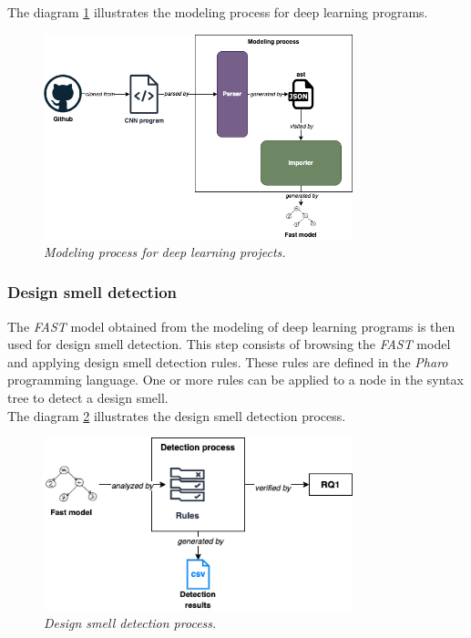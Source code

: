 The diagram \ref{fig:modelling} illustrates the modeling process for deep learning programs.\\

\begin{figure}[h!]
  \centering
  \includegraphics[width=0.8\textwidth]{figure/design_smell_modeling.png}
  \caption{\emph{Modeling process for deep learning projects.}}
  \label{fig:modelling}
\end{figure}


\subsubsection{Design smell detection}
\label{sec:designSmellDetection}
The \emph{FAST} model obtained from the modeling of deep learning programs is then used for design smell detection. This step consists of browsing the \emph{FAST} model and applying design smell detection rules. These rules are defined in the \emph{Pharo} programming language. One or more rules can be applied to a node in the syntax tree to detect a design smell.\\

The diagram \ref{fig:detection} illustrates the design smell detection process.\\


\begin{figure}[h!]
  \centering
  \includegraphics[width=0.8\textwidth]{figure/design_smell_detection.png}
  \caption{\emph{Design smell detection process.}}
  \label{fig:detection}
\end{figure}

